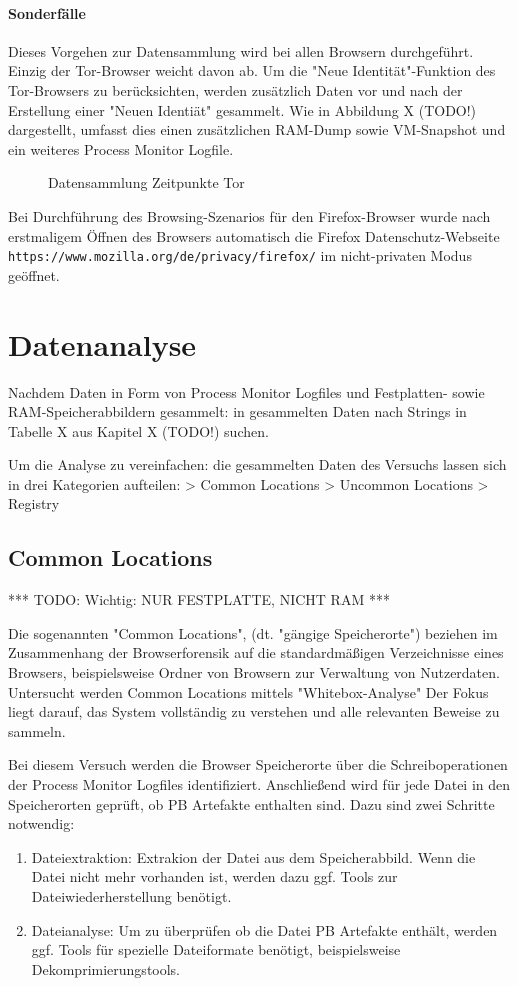 \paragraph*{Sonderfälle}
Dieses Vorgehen zur Datensammlung wird bei allen Browsern durchgeführt. Einzig der Tor-Browser weicht davon ab. Um die "Neue Identität"-Funktion des Tor-Browsers zu berücksichten, werden zusätzlich Daten vor und nach der Erstellung einer "Neuen Identiät" gesammelt. Wie in Abbildung X (TODO!) dargestellt, umfasst dies einen zusätzlichen RAM-Dump sowie VM-Snapshot und ein weiteres Process Monitor Logfile.
\begin{figure}[h!]
	\centering
	\small
	\centerline{\resizebox{\linewidth}{!}{}}
	\caption{Datensammlung Zeitpunkte Tor}
	\label{fig:jes}
\end{figure}	
Bei Durchführung des Browsing-Szenarios für den Firefox-Browser wurde nach erstmaligem Öffnen des Browsers automatisch die Firefox Datenschutz-Webseite \texttt{https://www.mozilla.org/de/privacy/firefox/} im nicht-privaten Modus geöffnet. 

\section{Datenanalyse}
Nachdem Daten in Form von Process Monitor Logfiles und Festplatten- sowie RAM-Speicherabbildern gesammelt: in gesammelten Daten nach Strings in Tabelle X aus Kapitel X (TODO!) suchen. 

Um die Analyse zu vereinfachen: die gesammelten Daten des Versuchs lassen sich in drei Kategorien aufteilen:
> Common Locations
> Uncommon Locations	
> Registry

\subsection{Common Locations}

*** TODO: Wichtig: NUR FESTPLATTE, NICHT RAM ***

Die sogenannten "Common Locations", (dt. "gängige Speicherorte") beziehen im Zusammenhang der Browserforensik auf die standardmäßigen Verzeichnisse eines Browsers, beispielsweise Ordner von Browsern zur Verwaltung von Nutzerdaten.
Untersucht werden Common Locations mittels "Whitebox-Analyse" \cite{Bonetti.2014}
Der Fokus liegt darauf, das System vollständig zu verstehen und alle relevanten Beweise zu sammeln.

Bei diesem Versuch werden die Browser Speicherorte über die Schreiboperationen der Process Monitor Logfiles identifiziert.
Anschließend wird für jede Datei in den Speicherorten geprüft, ob PB Artefakte enthalten sind.
Dazu sind zwei Schritte notwendig:
\begin{enumerate}
\item Dateiextraktion: Extrakion der Datei aus dem Speicherabbild. Wenn die Datei nicht mehr vorhanden ist, werden dazu ggf. Tools zur Dateiwiederherstellung benötigt.
\item Dateianalyse: Um zu überprüfen ob die Datei PB Artefakte enthält, werden ggf. Tools für spezielle Dateiformate benötigt, beispielsweise Dekomprimierungstools.
\end{enumerate}

